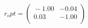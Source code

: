 \documentclass[10pt,a4paper]{article}
\begin{document}
 \begin{equation*} r_opt  =  %
\begin{pmatrix}{}
  -1.00 & -0.04 \\ 
  0.03 & -1.00 \\ 
  \end{pmatrix}
 \end{equation*} 
\end{document}
